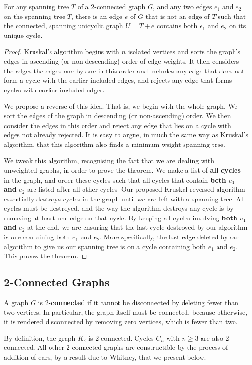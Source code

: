 \documentclass{llncs}
\begin{document}
\begin{theorem}\label{revkrustwoedges}
	For any spanning tree $T$ of a 2-connected graph $G$, and any two edges $e_1$ and $e_2$ on the spanning tree $T$, there is an edge $e$ of $G$ that is not an edge of $T$ such that the connected, spanning unicyclic graph $U=T+e$ contains both $e_1$ and $e_2$ on its unique cycle. 
\end{theorem}
\begin{proof}
	Kruskal's algorithm begins with $n$ isolated vertices and sorts the graph's edges in ascending (or non-descending) order of edge weights. It then considers the edges the edges one by one in this order and includes any edge that does not form a cycle with the earlier included edges, and rejects any edge that forms cycles with earlier included edges. 
	
	We propose a reverse of this idea. That is, we begin with the whole graph. We sort the edges of the graph in descending (or non-ascending) order. We then consider the edges in this order and reject any edge that lies on a cycle with edges not already rejected. It is easy to argue, in much the same way as Kruskal's algorithm, that this algorithm also finds a minimum weight spanning tree. 
	
	We tweak this algorithm, recognising the fact that we are dealing with unweighted graphs, in order to prove the theorem. We make a list of {\bf all cycles} in the graph, and order these cycles such that all cycles that contain {\bf both $e_1$ and $e_2$} are listed after all other cycles. Our proposed Kruskal reversed algorithm essentially destroys cycles in the graph until we are left with a spanning tree. All cycles must be destroyed, and the way the algorithm destroys any cycle is by removing at least one edge on that cycle. By keeping all cycles involving {\bf both $e_1$ and $e_2$} at the end, we are ensuring that the last cycle destroyed by our algorithm is one containing both $e_1$ and $e_2$. More specifically, the last edge deleted by our algorithm to give us our spanning tree is on a cycle containing both $e_1$ and $e_2$. This proves the theorem. 
\end{proof}


\subsection{2-Connected Graphs}
\begin{definition}
	A graph $G$ is $2${\bf-connected} if it cannot be disconnected by deleting fewer than two vertices. In particular, the graph itself must be connected, because otherwise, it is rendered disconnected by removing zero vertices, which is fewer than two.
\end{definition}
By definition, the graph $K_2$ is $2$-connected. Cycles $C_n$ with $n\ge3$ are also 2-connected. All other $2$-connected graphs are constructible by the process of addition of ears, by a result due to Whitney, that we present below.
\end{document}
